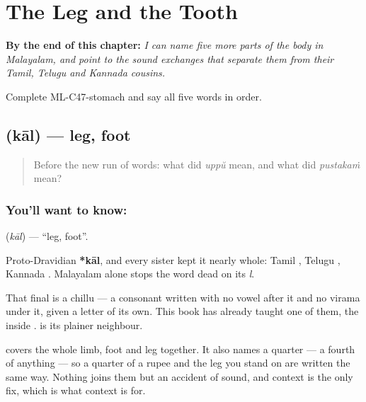 
\chapter{The Leg and the Tooth}
\label{ch:ml-body-more}

\begin{chapteropening}
\textbf{By the end of this chapter:} \emph{I can name five more parts of the body in Malayalam, and point to the sound exchanges that separate them from their Tamil, Telugu and Kannada cousins.}

Complete ML-C47-stomach and say all five words in order.
\end{chapteropening}

\section[\texorpdfstring{\ml{കാൽ} (kāl)}{കാൽ (kāl)}]{ (kāl) — leg, foot}

\label{lesson:ML-C47-leg}



\begin{quote}
Before the new run of words: what did \emph{uppŭ} mean, and what did \emph{pustakaṁ} mean?
\end{quote}

\subsection*{You'll want to know: }
\textbf{} (\emph{kāl}) — \textquotedblleft{}leg, foot\textquotedblright{}.

Proto-Dravidian \textbf{*kāl}, and every sister kept it nearly whole: Tamil , Telugu , Kannada . Malayalam alone stops the word dead on its \emph{l}.

That final  is a chillu — a consonant written with no vowel after it and no virama under it, given a letter of its own. This book has already taught one of them, the  inside .  is its plainer neighbour.

 covers the whole limb, foot and leg together. It also names a quarter — a fourth of anything — so a quarter of a rupee and the leg you stand on are written the same way. Nothing joins them but an accident of sound, and context is the only fix, which is what context is for.

